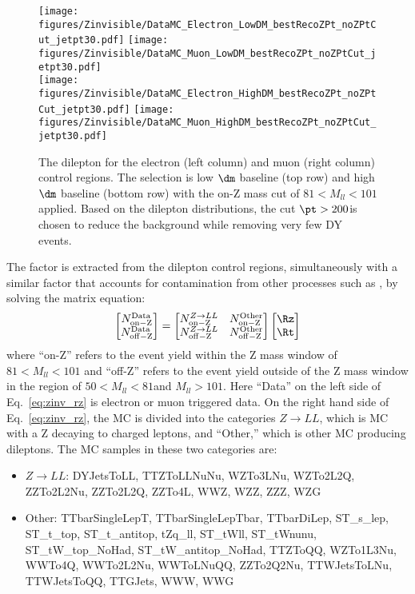 \begin{figure}[tbp]
{
\centering
\texttt{[image: figures/Zinvisible/DataMC\_Electron\_LowDM\_bestRecoZPt\_noZPtCut\_jetpt30.pdf]}
\texttt{[image: figures/Zinvisible/DataMC\_Muon\_LowDM\_bestRecoZPt\_noZPtCut\_jetpt30.pdf]} \\
\texttt{[image: figures/Zinvisible/DataMC\_Electron\_HighDM\_bestRecoZPt\_noZPtCut\_jetpt30.pdf]}
\texttt{[image: figures/Zinvisible/DataMC\_Muon\_HighDM\_bestRecoZPt\_noZPtCut\_jetpt30.pdf]} \\
\caption[The dilepton \pt for the electron and muon control regions]
{
    The dilepton \pt for the electron (left column) and muon (right column) control regions.
    The selection is low $\dm$ baseline (top row) and high $\dm$ baseline (bottom row) with the on-Z mass cut of $81<M_{ll}<101$\GeV applied.
    Based on the dilepton \pt distributions, the cut $\pt > 200$\GeV is chosen to reduce the \ttbar background while removing very few DY events.
}
\label{fig:zpt}
}
\end{figure}

The factor \Rz is extracted from the dilepton control regions, simultaneously with a similar factor \Rt that accounts for contamination from other processes such  as \ttbar, by solving the matrix equation:
\begin{equation} %
\label{eq:zinv_rz}
\begin{bmatrix}
N_\mathrm{on-Z}^\mathrm{Data} \\
N_\mathrm{off-Z}^\mathrm{Data}
\end{bmatrix}
=
\begin{bmatrix}
N_\mathrm{on-Z}^{Z \to LL} & N_\mathrm{on-Z}^\mathrm{Other} \\
N_\mathrm{off-Z}^{Z \to LL} & N_\mathrm{off-Z}^\mathrm{Other}
\end{bmatrix}
\begin{bmatrix}
\Rz \\
\Rt
\end{bmatrix}
\end{equation}
where ``on-Z'' refers to the event yield within the Z mass window of $81<M_{ll}<101$\GeV
and ``off-Z'' refers to the event yield outside of the Z mass window in the region of $50<M_{ll}<81$\GeV and $M_{ll}>101$\GeV.
Here ``Data'' on the left side of Eq.~\ref{eq:zinv_rz} is electron or muon triggered data.
On the right hand side of Eq.~\ref{eq:zinv_rz}, the MC is divided into the categories $Z \to LL$, which is MC with a Z decaying to charged leptons, and ``Other,'' which is other MC producing dileptons.
The MC samples in these two categories are:
\begin{itemize}
\item $Z \to LL$: DYJetsToLL, TTZToLLNuNu, WZTo3LNu, WZTo2L2Q, ZZTo2L2Nu, ZZTo2L2Q, ZZTo4L, WWZ, WZZ, ZZZ, WZG
\item Other: TTbarSingleLepT, TTbarSingleLepTbar, TTbarDiLep, ST\_s\_lep, ST\_t\_top, ST\_t\_antitop, tZq\_ll, ST\_tWll, ST\_tWnunu, ST\_tW\_top\_NoHad, ST\_tW\_antitop\_NoHad, TTZToQQ, WZTo1L3Nu, WWTo4Q, WWTo2L2Nu, WWToLNuQQ, ZZTo2Q2Nu, TTWJetsToLNu, TTWJetsToQQ, TTGJets, WWW, WWG
\end{itemize}

